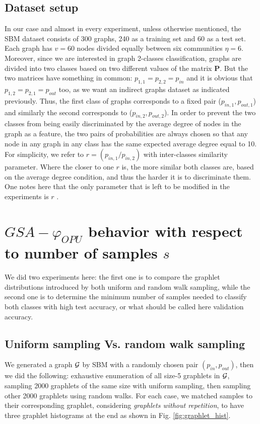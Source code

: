 \subsection{Dataset setup}
In our case and almost in every experiment, unless otherwise mentioned, the SBM dataset consists of 300 graphs, 240 as a training set and 60 as a test set. Each graph has $v=60$ nodes divided equally between six communities $\eta=6$. Moreover, since we are interested in graph 2-classes classification, graphs are divided into two classes based on two different values of the matrix $\mathbf{P}$. But the two matrices have something in common:  $p_{1,1}= p_{2,2} = p_{in}$ and it is obvious that  $p_{1,2}=p_{2,1}=p_{out}$ too, as we want an indirect graphs dataset as indicated previously.\newline
Thus, the first class of graphs corresponds to a fixed pair ($p_{in,1}, p_{out,1}$) and similarly the second   corresponds to ($p_{in,2}, p_{out,2}$). \newline 
In order to prevent the two classes from being easily discriminated by the average degree of nodes in the graph as a feature, the two pairs of probabilities are always chosen so that any node in any graph in any class has the same expected average degree equal to 10. For simplicity, we refer to $r=(p_{in,1}/p_{in,2})$ with inter-classes similarity parameter. Where the closer to one $r$ is, the more similar both classes are, based on the average degree condition,  and thus the harder it is to discriminate them. One notes here that the only parameter that is left to be modified in the experiments is $r$ .


\section{$GSA-\varphi_{OPU}$ behavior with respect to number of samples $s$}
We did two experiments here: the first one is to compare the graphlet distributions introduced by both uniform and random walk sampling, while the second one is to determine the minimum number of samples needed to classify both classes with high test accuracy, or what should be called here validation accuracy.\newline
\subsection{Uniform sampling Vs. random walk sampling}
We generated a graph $\mathcal{G}$ by SBM with a randomly chosen pair $(p_{in},p_{out})$, then we did the following: exhaustive enumeration of all size-5 graphlets in $\mathcal{G}$,  sampling 2000 graphlets of the same size with uniform sampling, then sampling other 2000 graphlets using random walks. For each case, we matched samples to their corresponding graphlet, considering \emph{graphlets without repetition}, to have three graphlet histograms at the end as shown in Fig. \ref{fig:graphlet_hist}. 


